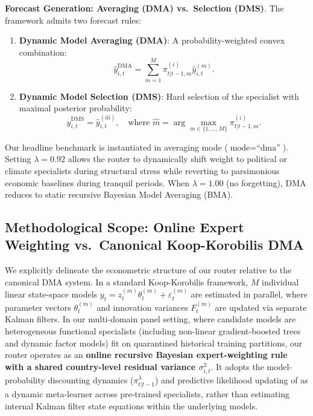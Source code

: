 \documentclass[11pt,a4paper]{article}
\begin{document}
\noindent \textbf{Forecast Generation: Averaging (DMA) vs.\ Selection (DMS)}. The framework admits two forecast rules:
\begin{enumerate}[leftmargin=*, label=(\alph*)]
    \item \textbf{Dynamic Model Averaging (DMA)}: A probability-weighted convex combination:
    \begin{equation}
    \hat{y}_{i,t}^{\text{DMA}} = \sum_{m=1}^M \pi_{t|t-1, m}^{(i)} \hat{y}_{i,t}^{(m)}.
    \end{equation}
    \item \textbf{Dynamic Model Selection (DMS)}: Hard selection of the specialist with maximal posterior probability:
    \begin{equation}
    \hat{y}_{i,t}^{\text{DMS}} = \hat{y}_{i,t}^{(\hat{m})}, \quad \text{where } \hat{m} = \arg\max_{m \in \{1,\dots,M\}} \pi_{t|t-1, m}^{(i)}.
    \end{equation}
\end{enumerate}
Our headline benchmark is instantiated in averaging mode ($\text{mode} = \text{``dma''}$). Setting $\lambda = 0.92$ allows the router to dynamically shift weight to political or climate specialists during structural stress while reverting to parsimonious economic baselines during tranquil periods. When $\lambda = 1.00$ (no forgetting), DMA reduces to static recursive Bayesian Model Averaging (BMA).

\subsection{Methodological Scope: Online Expert Weighting vs.\ Canonical Koop-Korobilis DMA}

We explicitly delineate the econometric structure of our router relative to the canonical \citet{koop2012} DMA system. In a standard Koop-Korobilis framework, $M$ individual linear state-space models $y_t = z_t^{(m)} \theta_t^{(m)} + \varepsilon_t^{(m)}$ are estimated in parallel, where parameter vectors $\theta_t^{(m)}$ and innovation variances $F_t^{(m)}$ are updated via separate Kalman filters. In our multi-domain panel setting, where candidate models are heterogeneous functional specialists (including non-linear gradient-boosted trees and dynamic factor models) fit on quarantined historical training partitions, our router operates as an \textbf{online recursive Bayesian expert-weighting rule with a shared country-level residual variance $\sigma_{i,t}^2$}. It adopts the model-probability discounting dynamics ($\pi_{t|t-1}^{\lambda}$) and predictive likelihood updating of \citet{koop2012} as a dynamic meta-learner across pre-trained specialists, rather than estimating internal Kalman filter state equations within the underlying models.
\end{document}
